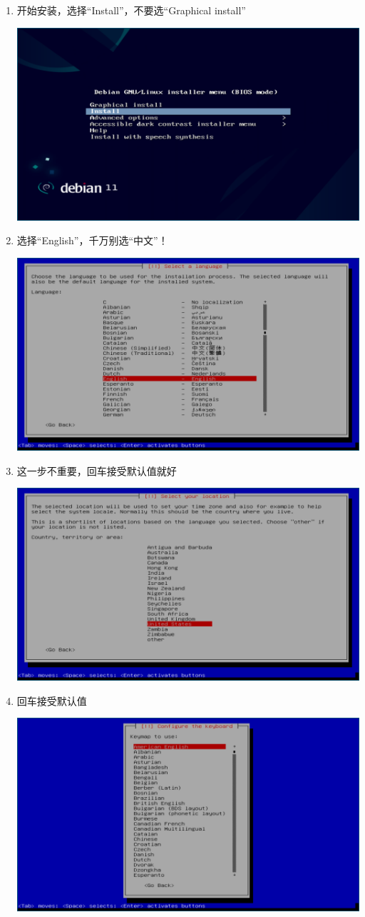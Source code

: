\documentclass{wx672ctexart} \usepackage{hyperref}
\begin{document}
\begin{enumerate}
\item 开始安装，选择“Install”，不要选“Graphical install”

\begin{center}
\includegraphics[width=.5\linewidth]{screenshots/01.png}
\end{center}

\item 选择“English”，千万别选“中文”！

\begin{center}
\includegraphics[width=.5\linewidth]{screenshots/02.png}
\end{center}

\item 这一步不重要，回车接受默认值就好

\begin{center}
\includegraphics[width=.5\linewidth]{screenshots/03.png}
\end{center}

\item 回车接受默认值

\begin{center}
\includegraphics[width=.5\linewidth]{screenshots/04.png}
\end{center}


\end{enumerate}
\end{document}
